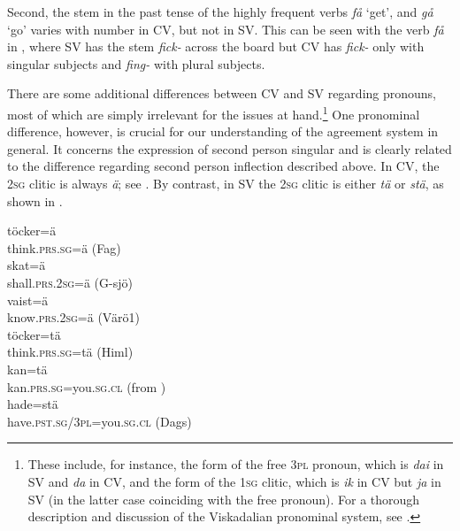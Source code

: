 \documentclass[output=paper,colorlinks,citecolor=brown,draft,draftmode]{langscibook}
\begin{document}
Second, the stem in the past tense of the highly frequent verbs \textit{få} ‘get’, and \textit{gå} ‘go’ varies with number in CV, but not in SV. This can be seen with the verb \textit{få} in , where SV has the stem \textit{fick-} across the board but CV has \textit{fick-} only with singular subjects and \textit{fing-} with plural subjects.



There are some additional differences between CV and SV regarding pronouns, most of which are simply irrelevant for the issues at hand.\footnote{These include, for instance, the form of the free 3\textsc{pl} pronoun, which is \textit{dai} in SV and \textit{da} in CV, and the form of the 1\textsc{sg} clitic, which is \textit{ik} in CV but \textit{ja} in SV (in the latter case coinciding with the free pronoun). For a thorough description and discussion of the Viskadalian pronominal system, see \citet{Petzell2017}.} One pronominal difference, however, is crucial for our understanding of the agreement system in general. It concerns the expression of second person singular and is clearly related to the difference regarding second person inflection described above. In CV, the 2\textsc{sg} clitic is always \textit{ä}; see . By contrast, in SV the 2\textsc{sg} clitic is either \textit{tä} or \textit{stä}, as shown in .


\ea\label{ex:petzell:19}
\ea\label{ex:petzell:19a}
\gll töcker=ä \\
    think.\textsc{prs.sg=}ä (Fag)    \\
\ex\label{ex:petzell:19b}
\gll skat=ä   \\
    shall.\textsc{prs}.2\textsc{sg}=ä (G-sjö)  \\
\ex\label{ex:petzell:19c}
\gll vaist=ä   \\
    know.\textsc{prs}.2\textsc{sg}=ä (Värö1)\\
\z
\ex\label{ex:petzell:20}
\ea\label{ex:petzell:20a}
\gll töcker=tä \\
    think.\textsc{prs.sg}=tä (Himl)  \\
\ex\label{ex:petzell:20b}
\gll kan=tä   \\
    kan.\textsc{prs.sg}=you.\textsc{sg}.\textsc{cl} (from \citealt{Andersson1922})  \\
\ex\label{ex:petzell:20c}
\gll hade=stä   \\
    have.\textsc{pst}.\textsc{sg}/3\textsc{pl}=you.\textsc{sg}.\textsc{cl} (Dags)\\
\z
\z
\end{document}
